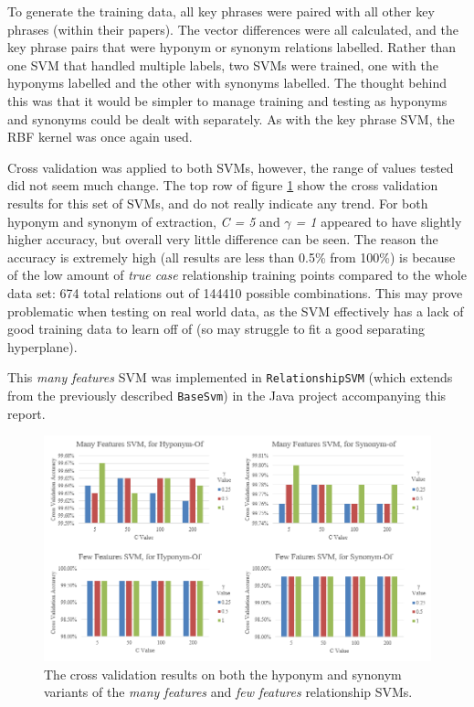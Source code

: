 To generate the training data, all key phrases were paired with all other key phrases (within their papers). The vector differences were all calculated, and the key phrase pairs that were hyponym or synonym relations labelled. Rather than one SVM that handled multiple labels, two SVMs were trained, one with the hyponyms labelled and the other with synonyms labelled. The thought behind this was that it would be simpler to manage training and testing as hyponyms and synonyms could be dealt with separately. As with the key phrase SVM, the RBF kernel was once again used.

Cross validation was applied to both SVMs, however, the range of values tested did not seem much change. The top row of figure \ref{figure:relsvmcv} show the cross validation results for this set of SVMs, and do not really indicate any trend. For both hyponym and synonym of extraction, \textit{C = 5} and \textit{$\gamma$ = 1} appeared to have slightly higher accuracy, but overall very little difference can be seen. The reason the accuracy is extremely high (all results are less than 0.5\% from 100\%) is because of the low amount of \textit{true case} relationship training points compared to the whole data set: 674 total relations out of 144410 possible combinations. This may prove problematic when testing on real world data, as the SVM effectively has a lack of good training data to learn off of (so may struggle to fit a good separating hyperplane).

This \textit{many features} SVM was implemented in \texttt{RelationshipSVM} (which extends from the previously described \texttt{BaseSvm}) in the Java project accompanying this report.

\begin{figure}
	\includegraphics[width=\textwidth]{img/relsvmcrossvalidation.png}
	\caption[Relation SVM Cross Validation]{The cross validation results on both the hyponym and synonym variants of the \textit{many features} and \textit{few features} relationship SVMs.}
	\label{figure:relsvmcv}
\end{figure}


